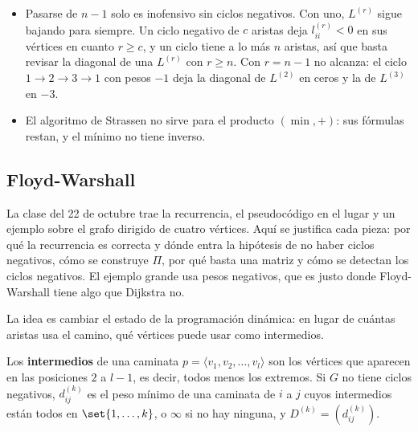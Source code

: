 \documentclass[11pt,letterpaper]{article}
\begin{document}
\begin{ojo}
  \begin{itemize}[itemsep=0.2em, leftmargin=1.2em]
    \item Pasarse de $n - 1$ solo es inofensivo sin ciclos negativos.
          Con uno, $L^{(r)}$ sigue bajando para siempre. Un ciclo
          negativo de $c$ aristas deja $l^{(r)}_{ii} < 0$ en sus
          vértices en cuanto $r \ge c$, y un ciclo tiene a lo más $n$
          aristas, así que basta revisar la diagonal de una $L^{(r)}$
          con $r \ge n$. Con $r = n - 1$ no alcanza: el ciclo
          $1 \to 2 \to 3 \to 1$ con pesos $-1$ deja la diagonal de
          $L^{(2)}$ en ceros y la de $L^{(3)}$ en $-3$.
    \item El algoritmo de Strassen no sirve para el producto
          $(\min, +)$: sus fórmulas restan, y el mínimo no tiene
          inverso.
  \end{itemize}
\end{ojo}


\subsection*{Floyd-Warshall}

La clase del 22 de octubre trae la recurrencia, el pseudocódigo en el
lugar y un ejemplo sobre el grafo dirigido de cuatro vértices. Aquí se
justifica cada pieza: por qué la recurrencia es correcta y dónde entra
la hipótesis de no haber ciclos negativos, cómo se construye $\Pi$,
por qué basta una matriz y cómo se detectan los ciclos negativos. El
ejemplo grande usa pesos negativos, que es justo donde Floyd-Warshall
tiene algo que Dijkstra no.

La idea es cambiar el estado de la programación dinámica: en lugar de
cuántas aristas usa el camino, qué vértices puede usar como
intermedios.

\begin{definicion}
  \label{def:intermedio-floyd}
  Los \textbf{intermedios} de una caminata
  $p = \langle v_1, v_2, \dots, v_l \rangle$ son los vértices que
  aparecen en las posiciones $2$ a $l - 1$, es decir, todos menos los
  extremos. Si $G$ no tiene ciclos negativos, $d^{(k)}_{ij}$ es el
  peso mínimo de una caminata de $i$ a $j$ cuyos intermedios están
  todos en $\set{1, \dots, k}$, o $\infty$ si no hay ninguna, y
  $D^{(k)} = (d^{(k)}_{ij})$.
\end{definicion}
\end{document}
